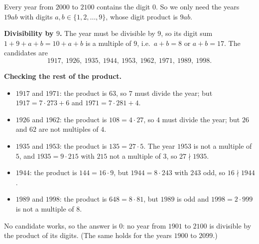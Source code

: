 Every year from $2000$ to $2100$ contains the digit $0$. So we only need the years $19ab$ with digits $a,b\in\{1,2,\dots,9\}$, whose digit product is $9ab$.

\textbf{Divisibility by $9$.} The year must be divisible by $9$, so its digit sum $1+9+a+b=10+a+b$ is a multiple of $9$, i.e.\ $a+b=8$ or $a+b=17$. The candidates are
\[
1917,\ 1926,\ 1935,\ 1944,\ 1953,\ 1962,\ 1971,\ 1989,\ 1998 .
\]

\textbf{Checking the rest of the product.}
\begin{itemize}
\item $1917$ and $1971$: the product is $63$, so $7$ must divide the year; but $1917=7\cdot273+6$ and $1971=7\cdot281+4$.
\item $1926$ and $1962$: the product is $108=4\cdot27$, so $4$ must divide the year; but $26$ and $62$ are not multiples of $4$.
\item $1935$ and $1953$: the product is $135=27\cdot5$. The year $1953$ is not a multiple of $5$, and $1935=9\cdot215$ with $215$ not a multiple of $3$, so $27\nmid1935$.
\item $1944$: the product is $144=16\cdot9$, but $1944=8\cdot243$ with $243$ odd, so $16\nmid1944$.
\item $1989$ and $1998$: the product is $648=8\cdot81$, but $1989$ is odd and $1998=2\cdot999$ is not a multiple of $8$.
\end{itemize}
No candidate works, so the answer is $\boxed{0}$: no year from $1901$ to $2100$ is divisible by the product of its digits. (The same holds for the years $1900$ to $2099$.)
